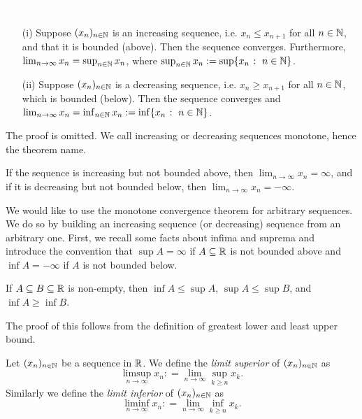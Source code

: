 \documentclass{article}
\begin{document}
\begin{theorem}
\label{thm:mon_conv}
\textcolor{white}{skip}
\begin{itemize}
\item[(i)] Suppose $(x_n)_{n\in {\mathbb{N}}}$ is an increasing sequence, i.e. $x_n\leq x_{n+1}$ for all $n\in {\mathbb{N}}$, and that it is bounded (above). Then the sequence converges. Furthermore, $\lim_{n\to \infty} x_n = \sup_{n\in {\mathbb{N}}} x_n$, where $\sup_{n\in {\mathbb{N}}} x_n := \sup\{x_n \; \colon \; n\in {\mathbb{N}}\}$.
\item[(ii)] Suppose $(x_n)_{n\in {\mathbb{N}}}$ is a decreasing sequence, i.e. $x_n\geq x_{n+1}$ for all $n\in {\mathbb{N}}$, which is bounded (below). Then the sequence converges and $\lim_{n\to \infty} x_n = \inf_{n\in {\mathbb{N}}} x_n := \inf\{x_n \; \colon \; n\in {\mathbb{N}}\}$. 
\end{itemize}
\end{theorem}

The proof is omitted. We call increasing or decreasing sequences monotone, hence the theorem name.

If the sequence is increasing but not bounded above, then $\lim_{n\to \infty} x_n = \infty$, and if it is decreasing but not bounded below, then $\lim_{n\to \infty} x_n = -\infty$.

 We would like to use the monotone convergence theorem for arbitrary sequences. We do so by building an increasing sequence (or decreasing) sequence from an arbitrary one. First, we recall some facts about infima and suprema and introduce the convention that $\sup A = \infty$ if $A\subseteq {\mathbb{R}}$ is not bounded above and $\inf A= -\infty$ if $A$ is not bounded below.

\begin{lemma}\label{lem:inf_sup_inequality}
If $A \subseteq B \subseteq {\mathbb{R}}$ is non-empty, then $\inf A \leq \sup A$, $\sup A \leq \sup B$, and $\inf A \geq \inf B$.
\end{lemma}
The proof of this follows from the definition of greatest lower and least upper bound. 

\begin{definition}
Let $(x_n)_{n\in {\mathbb{N}}}$ be a sequence in ${\mathbb{R}}$. We define the \emph{limit superior} of $(x_n)_{n\in {\mathbb{N}}}$ as 
$$\limsup_{n\to \infty} x_n: = \lim_{n\to \infty} \sup_{k\geq n} x_k.$$ 
Similarly we define  the \emph{limit inferior} of $(x_n)_{n\in {\mathbb{N}}}$ as 
$$\liminf_{n\to \infty} x_n: = \lim_{n\to \infty} \inf_{k\geq n} x_k.$$
\end{definition}
\end{document}
